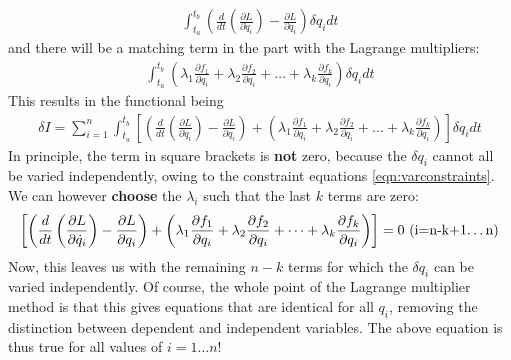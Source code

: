 \begin{align}
\int_{t_a}^{t_b}  \left(\frac{d}{dt}\left(\frac{\partial L}{\partial \dot{q}_i}\right)-\frac{\partial L}{\partial q_i}\right) \delta q_i dt
\end{align}
and there will be a matching term in the part with the Lagrange multipliers:
\begin{align}
\int_{t_a}^{t_b}  \left(\lambda_1 \frac{\partial f_1}{\partial q_i}+\lambda_2\frac{\partial f_2}{\partial q_i} +\dots +\lambda_k \frac{\partial f_k}{\partial q_i} \right) \delta q_i dt
\end{align}
This results in the functional being
\begin{align}
\delta I=\sum_{i=1}^n \int_{t_a}^{t_b}\left[ \left(\frac{d}{dt}\left(\frac{\partial L}{\partial \dot{q}_i}\right)-\frac{\partial L}{\partial q_i}\right) +\left(\lambda_1 \frac{\partial f_1}{\partial q_i}+\lambda_2\frac{\partial f_2}{\partial q_i} +\dots +\lambda_k \frac{\partial f_k}{\partial q_i} \right)\right] \delta q_i dt
\end{align}
In principle, the term in square brackets is \textbf{not} zero, because the $\delta q_i$ cannot all be varied independently, owing to the constraint equations \ref{eqn:varconstraints}. We can however \textbf{choose} the $\lambda_i$ such that the last $k$ terms are zero:
\begin{align}
\left[ \left(\frac{d}{dt}\left(\frac{\partial L}{\partial \dot{q}_i}\right)-\frac{\partial L}{\partial q_i}\right) +\left(\lambda_1 \frac{\partial f_1}{\partial q_i}+\lambda_2\frac{\partial f_2}{\partial q_i} +\dots +\lambda_k \frac{\partial f_k}{\partial q_i} \right)\right]=0 \text{  			(i=n-k+1\dots n)}
\label{eqn:ELLambda}
\end{align}
Now, this leaves us with the remaining $n-k$ terms for which the $\delta q_i$ can be varied independently. Of course, the whole point of the Lagrange multiplier method is that this gives equations that are identical for all $q_i$, removing the distinction between dependent and independent variables. The above equation is thus true for all values of $i=1\dots n$!

